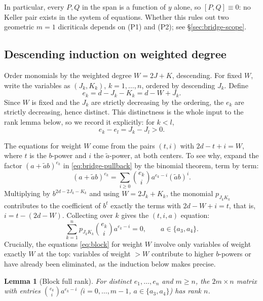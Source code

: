 \documentclass[a4paper,11pt]{article}
\theoremstyle{plain}
\newtheorem{lemma}[theorem]{Lemma}
\theoremstyle{definition}
\theoremstyle{remark}
\begin{document}
In particular, every $P, Q$ in the span is a function of $y$ alone, so $[P,Q] \equiv 0$: no
Keller pair exists in the system of equations. Whether this rules out two geometric $m = 1$
dicriticals depends on (P1) and (P2); see \S\ref{sec:bridge-scope}.

\subsection{Descending induction on weighted degree}

Order monomials by the weighted degree $W = 2J + K$, descending. For fixed $W$, write the
variables as $(J_k, K_k)$, $k = 1, \dots, n$, ordered by descending $J_k$. Define
\begin{equation}\label{eq:ek-def}
e_k = d - J_k - K_k = d - W + J_k.
\end{equation}
Since $W$ is fixed and the $J_k$ are strictly decreasing by the ordering, the $e_k$ are
strictly decreasing, hence distinct. This distinctness is the whole input to the rank lemma
below, so we record it explicitly: for $k < l$,
\[
e_k - e_l = J_k - J_l > 0.
\]

The equations for weight $W$ come from the pairs $(t, i)$ with $2d - t + i = W$, where $t$ is
the $b$-power and $i$ the $\tilde{a}$-power, at both centers. To see why, expand the factor
$(a + \tilde{a} b)^{e_k}$ in \eqref{eq:bridge-pullback} by the binomial theorem, term by
term:
\[
(a + \tilde{a} b)^{e_k} = \sum_{i \geq 0} \binom{e_k}{i} a^{e_k - i} (\tilde{a} b)^i.
\]
Multiplying by $b^{2d - 2J_k - K_k}$ and using $W = 2J_k + K_k$, the monomial $p_{J_k K_k}$
contributes to the coefficient of $b^t$ exactly the terms with $2d - W + i = t$, that is,
$i = t - (2d - W)$. Collecting over $k$ gives the $(t, i, a)$ equation:
\begin{equation}\label{eq:block}
\sum_{k=1}^n p_{J_k K_k}\binom{e_k}{i} a^{e_k-i} = 0, \qquad a \in \{a_3, a_4\}.
\end{equation}
Crucially, the equations \eqref{eq:block} for weight $W$ involve only variables of weight
exactly $W$ at the top: variables of weight $> W$ contribute to higher $b$-powers or have
already been eliminated, as the induction below makes precise.

\begin{lemma}[Block full rank]\label{lem:block-rank}
For distinct $e_1, \dots, e_n$ and $m \geq n$, the $2m \times n$ matrix with entries
$\binom{e_k}{i} a^{e_k-i}$ ($i = 0, \dots, m-1$, $a \in \{a_3, a_4\}$) has rank $n$.
\end{lemma}
\end{document}
